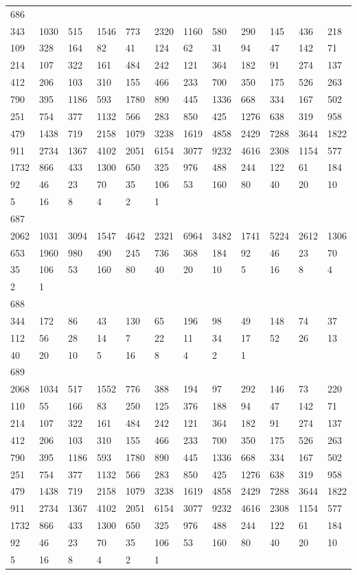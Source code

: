 \begin{longtable}{llllllllllll}
686&&&&&&&&&&&\\
343& 1030& 515& 1546& 773& 2320& 1160& 580& 290& 145& 436& 218\\
109& 328& 164& 82& 41& 124& 62& 31& 94& 47& 142& 71\\
214& 107& 322& 161& 484& 242& 121& 364& 182& 91& 274& 137\\
412& 206& 103& 310& 155& 466& 233& 700& 350& 175& 526& 263\\
790& 395& 1186& 593& 1780& 890& 445& 1336& 668& 334& 167& 502\\
251& 754& 377& 1132& 566& 283& 850& 425& 1276& 638& 319& 958\\
479& 1438& 719& 2158& 1079& 3238& 1619& 4858& 2429& 7288& 3644& 1822\\
911& 2734& 1367& 4102& 2051& 6154& 3077& 9232& 4616& 2308& 1154& 577\\
1732& 866& 433& 1300& 650& 325& 976& 488& 244& 122& 61& 184\\
92& 46& 23& 70& 35& 106& 53& 160& 80& 40& 20& 10\\
5& 16& 8& 4& 2& 1& \\

687&&&&&&&&&&&\\
2062& 1031& 3094& 1547& 4642& 2321& 6964& 3482& 1741& 5224& 2612& 1306\\
653& 1960& 980& 490& 245& 736& 368& 184& 92& 46& 23& 70\\
35& 106& 53& 160& 80& 40& 20& 10& 5& 16& 8& 4\\
2& 1& \\

688&&&&&&&&&&&\\
344& 172& 86& 43& 130& 65& 196& 98& 49& 148& 74& 37\\
112& 56& 28& 14& 7& 22& 11& 34& 17& 52& 26& 13\\
40& 20& 10& 5& 16& 8& 4& 2& 1& \\

689&&&&&&&&&&&\\
2068& 1034& 517& 1552& 776& 388& 194& 97& 292& 146& 73& 220\\
110& 55& 166& 83& 250& 125& 376& 188& 94& 47& 142& 71\\
214& 107& 322& 161& 484& 242& 121& 364& 182& 91& 274& 137\\
412& 206& 103& 310& 155& 466& 233& 700& 350& 175& 526& 263\\
790& 395& 1186& 593& 1780& 890& 445& 1336& 668& 334& 167& 502\\
251& 754& 377& 1132& 566& 283& 850& 425& 1276& 638& 319& 958\\
479& 1438& 719& 2158& 1079& 3238& 1619& 4858& 2429& 7288& 3644& 1822\\
911& 2734& 1367& 4102& 2051& 6154& 3077& 9232& 4616& 2308& 1154& 577\\
1732& 866& 433& 1300& 650& 325& 976& 488& 244& 122& 61& 184\\
92& 46& 23& 70& 35& 106& 53& 160& 80& 40& 20& 10\\
5& 16& 8& 4& 2& 1& \\


\end{longtable}
